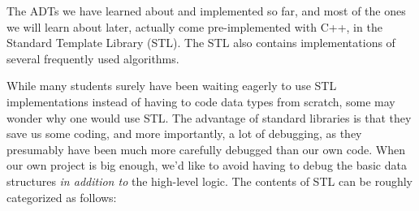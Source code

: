 The ADTs we have learned about and implemented so far, and
most of the ones we will learn about later, actually come
pre-implemented with C++, in the Standard Template Library (STL).
The STL also contains implementations of several frequently used
algorithms. 

While many students surely have been waiting eagerly to use STL
implementations instead of having to code data types from scratch,
some may wonder why one would use STL. The advantage of standard
libraries is that they save us some coding, and more importantly, a
lot of debugging, as they presumably have been much more carefully
debugged than our own code. When our own project is big enough, we'd
like to avoid having to debug the basic data structures \emph{in
  addition to} the high-level logic.
The contents of STL can be roughly categorized as follows:

